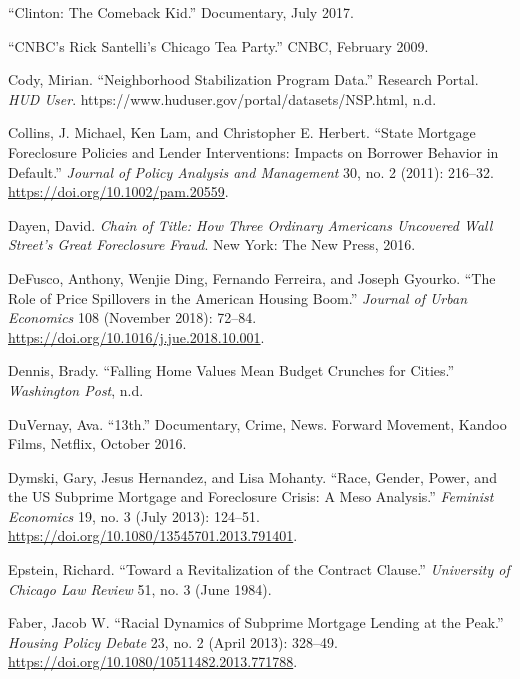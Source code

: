 \documentclass[12pt,oneside]{psthesis}
\begin{document}
\leavevmode\hypertarget{ref-albright2017clinton}{}%
``Clinton: The Comeback Kid.'' Documentary, July 2017.

\leavevmode\hypertarget{ref-santelli2009cnbc}{}%
``CNBC's Rick Santelli's Chicago Tea Party.'' CNBC, February 2009.

\leavevmode\hypertarget{ref-cody2010neighborhood}{}%
Cody, Mirian. ``Neighborhood Stabilization Program Data.'' Research Portal. \emph{HUD User}. https://www.huduser.gov/portal/datasets/NSP.html, n.d.

\leavevmode\hypertarget{ref-collins2011state}{}%
Collins, J. Michael, Ken Lam, and Christopher E. Herbert. ``State Mortgage Foreclosure Policies and Lender Interventions: Impacts on Borrower Behavior in Default.'' \emph{Journal of Policy Analysis and Management} 30, no. 2 (2011): 216--32. \url{https://doi.org/10.1002/pam.20559}.

\leavevmode\hypertarget{ref-dayenChainTitleHow2016}{}%
Dayen, David. \emph{Chain of Title: How Three Ordinary Americans Uncovered Wall Street's Great Foreclosure Fraud}. New York: The New Press, 2016.

\leavevmode\hypertarget{ref-defusco2018role}{}%
DeFusco, Anthony, Wenjie Ding, Fernando Ferreira, and Joseph Gyourko. ``The Role of Price Spillovers in the American Housing Boom.'' \emph{Journal of Urban Economics} 108 (November 2018): 72--84. \url{https://doi.org/10.1016/j.jue.2018.10.001}.

\leavevmode\hypertarget{ref-dennis2011falling}{}%
Dennis, Brady. ``Falling Home Values Mean Budget Crunches for Cities.'' \emph{Washington Post}, n.d.

\leavevmode\hypertarget{ref-duvernay201613th}{}%
DuVernay, Ava. ``13th.'' Documentary, Crime, News. Forward Movement, Kandoo Films, Netflix, October 2016.

\leavevmode\hypertarget{ref-dymski2013race}{}%
Dymski, Gary, Jesus Hernandez, and Lisa Mohanty. ``Race, Gender, Power, and the US Subprime Mortgage and Foreclosure Crisis: A Meso Analysis.'' \emph{Feminist Economics} 19, no. 3 (July 2013): 124--51. \url{https://doi.org/10.1080/13545701.2013.791401}.

\leavevmode\hypertarget{ref-epstein1984revitalization}{}%
Epstein, Richard. ``Toward a Revitalization of the Contract Clause.'' \emph{University of Chicago Law Review} 51, no. 3 (June 1984).

\leavevmode\hypertarget{ref-faber2013racial}{}%
Faber, Jacob W. ``Racial Dynamics of Subprime Mortgage Lending at the Peak.'' \emph{Housing Policy Debate} 23, no. 2 (April 2013): 328--49. \url{https://doi.org/10.1080/10511482.2013.771788}.
\end{document}

